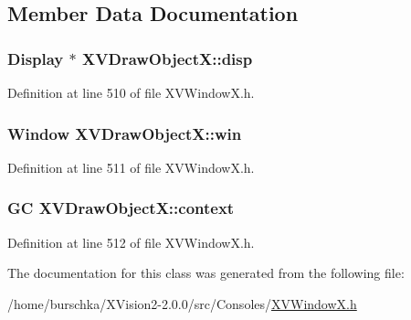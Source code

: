 \subsection{Member Data Documentation}
\label{XVDrawObjectX_m0}
\hypertarget{class_XVDrawObjectX_m0}{
\subsubsection[disp]{\setlength{\rightskip}{0pt plus 5cm}Display $\ast$ XVDraw\-Object\-X::disp}}




Definition at line 510 of file XVWindow\-X.h.\label{XVDrawObjectX_m1}
\hypertarget{class_XVDrawObjectX_m1}{
\subsubsection[win]{\setlength{\rightskip}{0pt plus 5cm}Window XVDraw\-Object\-X::win}}




Definition at line 511 of file XVWindow\-X.h.\label{XVDrawObjectX_m2}
\hypertarget{class_XVDrawObjectX_m2}{
\subsubsection[context]{\setlength{\rightskip}{0pt plus 5cm}GC XVDraw\-Object\-X::context}}




Definition at line 512 of file XVWindow\-X.h.

The documentation for this class was generated from the following file:\begin{CompactItemize}
\item 
/home/burschka/XVision2-2.0.0/src/Consoles/\hyperlink{XVWindowX.h-source}{XVWindow\-X.h}\end{CompactItemize}
